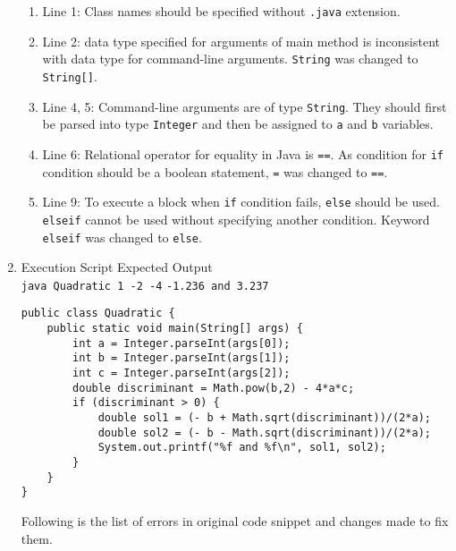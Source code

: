 \begin{enumerate}[label=\textbf{(\alph*)}]
\begin{enumerate}[label=\arabic*.]
\item Line 1: Class names should be specified without \texttt{.java} extension.
\item Line 2: data type specified for arguments of main method is inconsistent with data type for command-line arguments. \texttt{String} was changed to \texttt{String[]}.
\item Line 4, 5: Command-line arguments are of type \texttt{String}. They should first be parsed into type \texttt{Integer} and then be assigned to \texttt{a} and \texttt{b} variables.
\item Line 6: Relational operator for equality in Java is \texttt{==}. As condition for \texttt{if} condition should be a boolean statement, \texttt{=} was changed to \texttt{==}.
\item Line 9: To execute a block when \texttt{if} condition fails, \texttt{else} should be used. \texttt{elseif} cannot be used without specifying another condition. Keyword \texttt{elseif} was changed to \texttt{else}.
\end{enumerate}

\item Execution Script \hfill Expected Output\\
\texttt{java Quadratic 1 -2 -4} \hfill \texttt{-1.236 and 3.237}

\begin{lstlisting}
public class Quadratic {
	public static void main(String[] args) {
		int a = Integer.parseInt(args[0]);
		int b = Integer.parseInt(args[1]);
		int c = Integer.parseInt(args[2]);
		double discriminant = Math.pow(b,2) - 4*a*c;
		if (discriminant > 0) {
			double sol1 = (- b + Math.sqrt(discriminant))/(2*a);
			double sol2 = (- b - Math.sqrt(discriminant))/(2*a);
			System.out.printf("%f and %f\n", sol1, sol2);
		}
	}
}
\end{lstlisting}

Following is the list of errors in original code snippet and changes made to fix them.


\end{enumerate}
